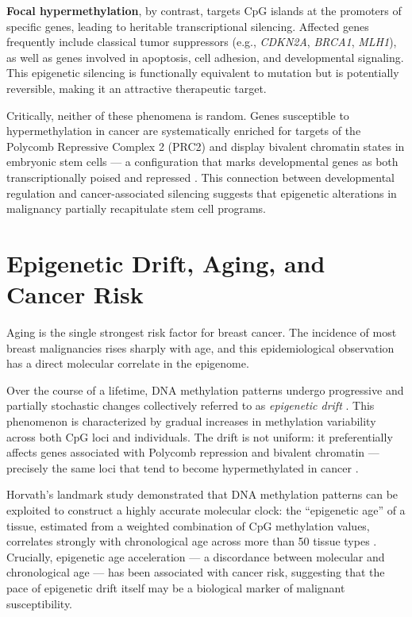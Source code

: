 \textbf{Focal hypermethylation}, by contrast, targets CpG islands at the promoters
of specific genes, leading to heritable transcriptional silencing. Affected genes
frequently include classical tumor suppressors (e.g., \textit{CDKN2A},
\textit{BRCA1}, \textit{MLH1}), as well as genes involved in apoptosis, cell
adhesion, and developmental signaling. This epigenetic silencing is functionally
equivalent to mutation but is potentially reversible, making it an attractive
therapeutic target.

Critically, neither of these phenomena is random. Genes susceptible to
hypermethylation in cancer are systematically enriched for targets of the Polycomb
Repressive Complex 2 (PRC2) and display bivalent chromatin states in embryonic
stem cells — a configuration that marks developmental genes as both transcriptionally
poised and repressed \cite{Teschendorff2010_stemcell}. This connection between
developmental regulation and cancer-associated silencing suggests that
epigenetic alterations in malignancy partially recapitulate stem cell programs.

\section{Epigenetic Drift, Aging, and Cancer Risk}

Aging is the single strongest risk factor for breast cancer. The incidence of most
breast malignancies rises sharply with age, and this epidemiological observation
has a direct molecular correlate in the epigenome.

Over the course of a lifetime, DNA methylation patterns undergo progressive and
partially stochastic changes collectively referred to as \textit{epigenetic drift}
\cite{Horvath2013}. This phenomenon is characterized by gradual increases in
methylation variability across both CpG loci and individuals. The drift is not
uniform: it preferentially affects genes associated with Polycomb repression and
bivalent chromatin — precisely the same loci that tend to become hypermethylated
in cancer \cite{Teschendorff2010,Teschendorff2010_stemcell}.

Horvath's landmark study demonstrated that DNA methylation patterns can be
exploited to construct a highly accurate molecular clock: the ``epigenetic age''
of a tissue, estimated from a weighted combination of CpG methylation values,
correlates strongly with chronological age across more than 50 tissue types
\cite{Horvath2013}. Crucially, epigenetic age acceleration — a discordance between
molecular and chronological age — has been associated with cancer risk, suggesting
that the pace of epigenetic drift itself may be a biological marker of malignant
susceptibility.

